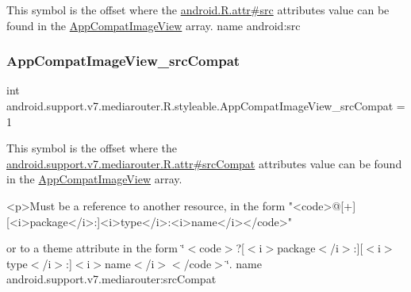 This symbol is the offset where the \hyperlink{}{android.\+R.\+attr\#src} attribute\textquotesingle{}s value can be found in the \hyperlink{classandroid_1_1support_1_1v7_1_1mediarouter_1_1R_1_1styleable_a0ce9cb60cf11193ca8edd3c65353bedf}{App\+Compat\+Image\+View} array.  name android\+:src \mbox{\label{classandroid_1_1support_1_1v7_1_1mediarouter_1_1R_1_1styleable_a71ebb568ec6b94514a7c9cdcace4bbbd}} 
\subsubsection{\texorpdfstring{App\+Compat\+Image\+View\+\_\+src\+Compat}{AppCompatImageView\_srcCompat}}
{\footnotesize\ttfamily int android.\+support.\+v7.\+mediarouter.\+R.\+styleable.\+App\+Compat\+Image\+View\+\_\+src\+Compat = 1\hspace{0.3cm}{\ttfamily [static]}}

This symbol is the offset where the \hyperlink{classandroid_1_1support_1_1v7_1_1mediarouter_1_1R_1_1attr_ab68acd44f9c211553442b740a973421c}{android.\+support.\+v7.\+mediarouter.\+R.\+attr\#src\+Compat} attribute\textquotesingle{}s value can be found in the \hyperlink{classandroid_1_1support_1_1v7_1_1mediarouter_1_1R_1_1styleable_a0ce9cb60cf11193ca8edd3c65353bedf}{App\+Compat\+Image\+View} array.

\begin{DoxyVerb}      <p>Must be a reference to another resource, in the form "<code>@[+][<i>package</i>:]<i>type</i>:<i>name</i></code>"
\end{DoxyVerb}
 or to a theme attribute in the form \char`\"{}$<$code$>$?\mbox{[}$<$i$>$package$<$/i$>$\+:\mbox{]}\mbox{[}$<$i$>$type$<$/i$>$\+:\mbox{]}$<$i$>$name$<$/i$>$$<$/code$>$\char`\"{}.  name android.\+support.\+v7.\+mediarouter\+:src\+Compat \mbox{\label{classandroid_1_1support_1_1v7_1_1mediarouter_1_1R_1_1styleable_a0c5a7d15ad417c65366ead3c4e4a2b25}} 
